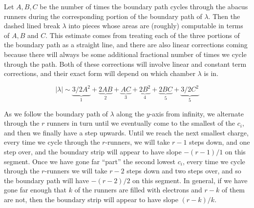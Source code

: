 \documentclass{amsart}[12pt]
\theoremstyle{definition}
\begin{document}
  Let $A, B, C$ be the number of times the boundary path cycles through the abacus runners during the corresponding portion of the boundary path of $\lambda$.  Then the dashed lined break $\lambda$ into pieces whose areas are (roughly) computable in terms of $A, B$ and $C$.  This estimate comes from treating each of the three portions of the boundary path as a straight line, and there are also linear corrections coming because there will always be some additional fractional number of times we cycle through the path.   Both of these corrections will involve linear and constant term corrections, and their exact form will depend on which chamber $\lambda$ is in.  


  
  \begin{equation*}
|\lambda|\sim \underbrace{3/2 A^2 }_{1}+\underbrace{2AB}_2+\underbrace{AC}_3+\underbrace{2B^2}_4+\underbrace{2BC}_5+\underbrace{3/2 C^2}_5
  \end{equation*}

  

As we follow the boundary path of $\lambda$ along the $y$-axis from infinity, we alternate through the $r$ runners in turn until we eventually come to the smallest of the $c_i$, and then we finally have a step upwards.  Until we reach the next smallest charge, every time we cycle through the $r$-runners, we will take $r-1$ steps down, and one step over, and the boundary strip will appear to have slope $-(r-1)/1$ on this segment.  Once we have gone far ``part'' the second lowest $c_i$, every time we cycle through the $r$-runners we will take $r-2$ steps down and two steps over, and so the boundary path will have $-(r-2)/2$ on this segment.  In general, if we have gone far enough that $k$ of the runners are filled with electrons and $r-k$ of them are not, then the boundary strip will appear to have slope $(r-k)/k$.
\end{document}
